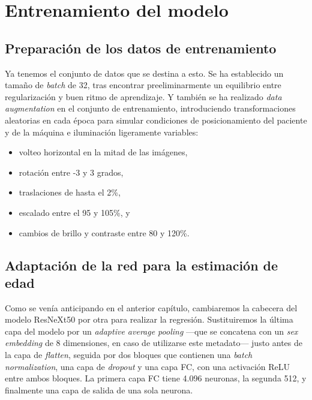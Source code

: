 
\section{Entrenamiento del modelo}

\subsection{Preparación de los datos de entrenamiento}

Ya tenemos el conjunto de datos que se destina a esto. Se ha establecido un tamaño de \textit{batch} de 32, 
tras encontrar preeliminarmente un equilibrio entre regularización y buen ritmo de aprendizaje. 
Y también se ha realizado \textit{data augmentation} en el conjunto de entrenamiento, introduciendo 
transformaciones aleatorias en cada época para simular condiciones de posicionamiento del paciente y de la 
máquina e iluminación ligeramente variables: 
\begin{itemize}
    \item volteo horizontal en la mitad de las imágenes,
    \item rotación entre -3 y 3 grados,
    \item traslaciones de hasta el 2\%,
    \item escalado entre el 95 y 105\%, y
    \item cambios de brillo y contraste entre 80 y 120\%. 
\end{itemize}


\subsection{Adaptación de la red para la estimación de edad}

Como se venía anticipando en el anterior capítulo, cambiaremos la cabecera del modelo ResNeXt50 por otra 
para realizar la regresión. Sustituiremos la última capa del modelo por un \textit{adaptive average pooling}
---que se concatena con un \textit{sex embedding} de 8 dimensiones, en caso de utilizarse este metadato---
justo antes de la capa de \textit{flatten}, seguida por dos bloques que contienen una 
\textit{batch normalization}, una capa de \textit{dropout} y una capa FC, con una activación ReLU entre 
ambos bloques. La primera capa FC tiene 4.096 neuronas, la segunda 512, y finalmente una capa de salida 
de una sola neurona. 

